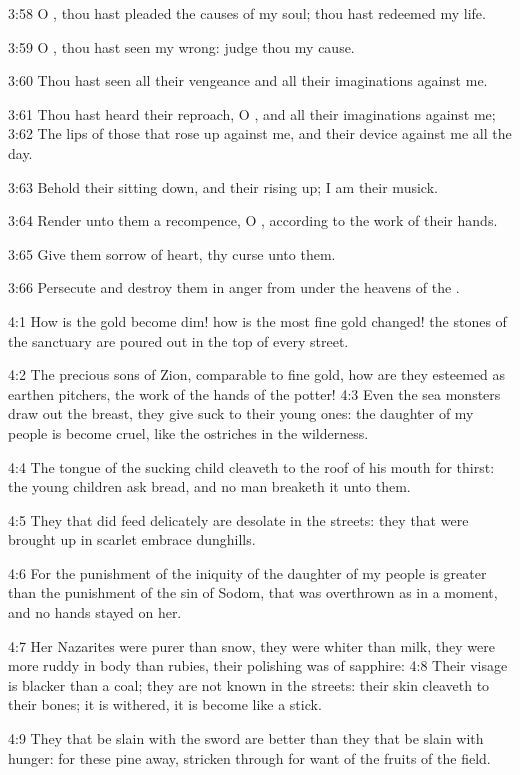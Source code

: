 3:58 O \LORD, thou hast pleaded the causes of my soul; thou hast redeemed my life.

3:59 O \LORD, thou hast seen my wrong: judge thou my cause.

3:60 Thou hast seen all their vengeance and all their imaginations against me.

3:61 Thou hast heard their reproach, O \LORD, and all their imaginations against me; 3:62 The lips of those that rose up against me, and their device against me all the day.

3:63 Behold their sitting down, and their rising up; I am their musick.

3:64 Render unto them a recompence, O \LORD, according to the work of their hands.

3:65 Give them sorrow of heart, thy curse unto them.

3:66 Persecute and destroy them in anger from under the heavens of the \LORD.

4:1 How is the gold become dim! how is the most fine gold changed! the stones of the sanctuary are poured out in the top of every street.

4:2 The precious sons of Zion, comparable to fine gold, how are they esteemed as earthen pitchers, the work of the hands of the potter!  4:3 Even the sea monsters draw out the breast, they give suck to their young ones: the daughter of my people is become cruel, like the ostriches in the wilderness.

4:4 The tongue of the sucking child cleaveth to the roof of his mouth for thirst: the young children ask bread, and no man breaketh it unto them.

4:5 They that did feed delicately are desolate in the streets: they that were brought up in scarlet embrace dunghills.

4:6 For the punishment of the iniquity of the daughter of my people is greater than the punishment of the sin of Sodom, that was overthrown as in a moment, and no hands stayed on her.

4:7 Her Nazarites were purer than snow, they were whiter than milk, they were more ruddy in body than rubies, their polishing was of sapphire: 4:8 Their visage is blacker than a coal; they are not known in the streets: their skin cleaveth to their bones; it is withered, it is become like a stick.

4:9 They that be slain with the sword are better than they that be slain with hunger: for these pine away, stricken through for want of the fruits of the field.

